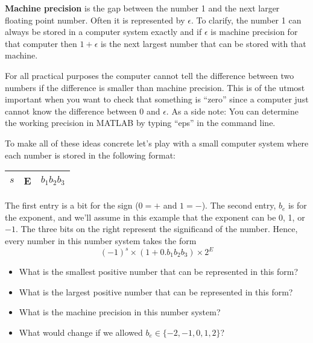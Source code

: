 \begin{definition}
    {\bf Machine precision} is the gap between the number 1 and the next larger floating
    point number. Often it is represented by $\epsilon$. To clarify, the number 1 can
    always be stored in a computer system exactly and if $\epsilon$ is machine
    precision for that computer then $1+\epsilon$ is the next largest number that can
    be stored with that machine. 
\end{definition}
For all practical purposes the computer cannot tell the difference between two numbers if
the difference is smaller than machine precision. This is of the utmost important when you
want to check that something is ``zero'' since a computer just cannot know the difference
between $0$ and $\epsilon$.
As a side note: You can determine the working precision in MATLAB by typing ``eps'' in the
command line.



\begin{problem}
    To make all of these ideas concrete let's play with a small computer system where each
    number is stored in the following format:
    \begin{center}
        \begin{tabular}{|c|c|c|}
            \hline
            $s$ & E & $b_1b_2b_3$ \\ \hline
        \end{tabular}
    \end{center}
    The first entry is a bit for the sign (0$=+$ and $1=-$). The second entry, $b_e$ is for the
    exponent, and we'll assume in this example that the exponent can be 0, 1, or $-1$.  The
    three bits on the right represent the significand of the number.  Hence, every number in
    this number system takes the form
    \[ (-1)^s \times (1+ 0.b_1b_2b_3) \times 2^{E} \]
    \begin{itemize}
        \item What is the smallest positive number that can be represented in this
            form?\\
        \item What is the largest positive number that can be represented in this
            form?\\
        \item What is the machine precision in this number system? \\
        \item What would change if we allowed $b_e \in \{-2,-1,0,1,2\}$?\\
    \end{itemize}
\end{problem}


